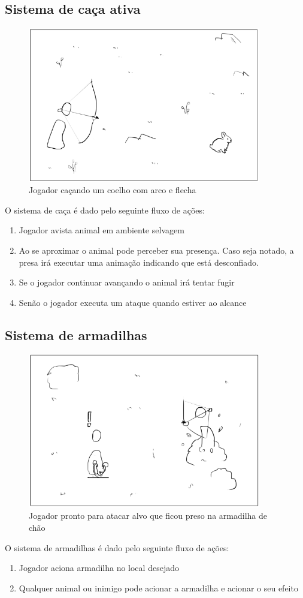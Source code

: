 \documentclass[12pt, 
openright, 
oneside, 
a4paper,    
brazil]{facom-ufu-abntex2}
\begin{document}
\subsection{Sistema de caça ativa}
\begin{figure}[H]
	\centering
	\includegraphics[width=4in]{imagens/mecanica_caca.png}
	\caption{Jogador caçando um coelho com arco e flecha}
\end{figure}
O sistema de caça é dado pelo seguinte fluxo de ações:
\begin{enumerate}  
\item Jogador avista animal em ambiente selvagem 
\item Ao se aproximar o animal pode perceber sua presença. Caso seja notado, a presa irá executar uma animação indicando que está desconfiado.
\item Se o jogador continuar avançando o animal irá tentar fugir 
\item Senão o jogador executa um ataque quando estiver ao alcance 
\end{enumerate}


\subsection{Sistema de armadilhas}
\begin{figure}[H]
	\centering
	\includegraphics[width=4in]{imagens/mecanica_armadilha.png}
	\caption{Jogador pronto para atacar alvo que ficou preso na armadilha de chão}
\end{figure}
O sistema de armadilhas é dado pelo seguinte fluxo de ações:
\begin{enumerate}  
\item Jogador aciona armadilha no local desejado
\item Qualquer animal ou inimigo pode acionar a armadilha e acionar o seu efeito
\end{enumerate}
\end{document}
